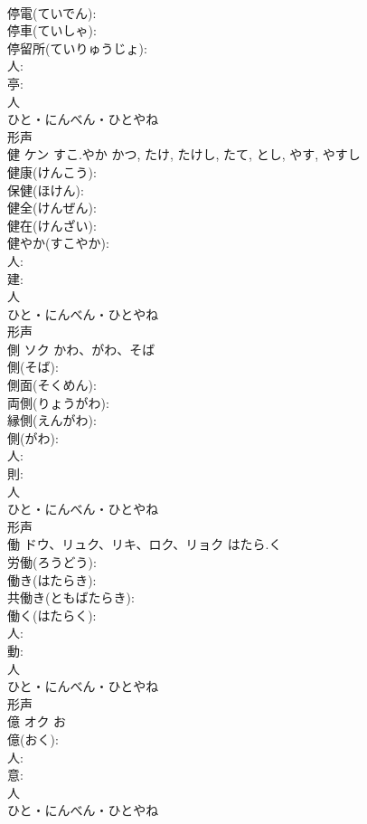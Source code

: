 \documentclass[8pt]{extreport}
\begin{document}
\begin{CJK}{UTF8}{min}
\\	停電(ていでん): 
\\	停車(ていしゃ): 
\\	停留所(ていりゅうじょ): 
\\	人: 
\\	亭: 
\\	人	
\\	ひと・にんべん・ひとやね	
\\	形声 
\\	健	ケン	すこ.やか	かつ, たけ, たけし, たて, とし, やす, やすし	
\\	健康(けんこう): 
\\	保健(ほけん): 
\\	健全(けんぜん): 
\\	健在(けんざい): 
\\	健やか(すこやか): 
\\	人: 
\\	建: 
\\	人	
\\	ひと・にんべん・ひとやね	
\\	形声 
\\	側	ソク	かわ、がわ、そば		
\\	側(そば): 
\\	側面(そくめん): 
\\	両側(りょうがわ): 
\\	縁側(えんがわ): 
\\	側(がわ): 
\\	人: 
\\	則: 
\\	人	
\\	ひと・にんべん・ひとやね	
\\	形声 
\\	働	ドウ、リュク、リキ、ロク、リョク	はたら.く		
\\	労働(ろうどう): 
\\	働き(はたらき): 
\\	共働き(ともばたらき): 
\\	働く(はたらく): 
\\	人: 
\\	動: 
\\	人	
\\	ひと・にんべん・ひとやね	
\\	形声 
\\	億	オク		お	
\\	億(おく): 
\\	人: 
\\	意: 
\\	人	
\\	ひと・にんべん・ひとやね	

\end{CJK}
\end{document}
